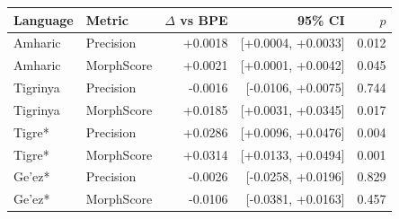 \begin{tabular}{llrrr}
\toprule
Language & Metric & $\Delta$ vs BPE & 95\% CI & $p$ \\
\midrule
Amharic & Precision & +0.0018 & [+0.0004, +0.0033] & 0.012 \\
Amharic & MorphScore & +0.0021 & [+0.0001, +0.0042] & 0.045 \\
Tigrinya & Precision & -0.0016 & [-0.0106, +0.0075] & 0.744 \\
Tigrinya & MorphScore & +0.0185 & [+0.0031, +0.0345] & 0.017 \\
Tigre* & Precision & +0.0286 & [+0.0096, +0.0476] & 0.004 \\
Tigre* & MorphScore & +0.0314 & [+0.0133, +0.0494] & 0.001 \\
Ge'ez* & Precision & -0.0026 & [-0.0258, +0.0196] & 0.829 \\
Ge'ez* & MorphScore & -0.0106 & [-0.0381, +0.0163] & 0.457 \\
\bottomrule
\end{tabular}
